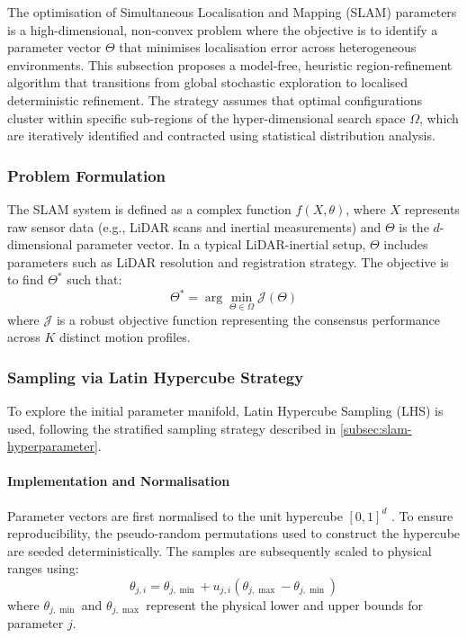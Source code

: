 The optimisation of Simultaneous Localisation and Mapping (SLAM) parameters is a high-dimensional, non-convex problem where the objective is to identify a parameter vector $\Theta$ that minimises localisation error across heterogeneous environments. This subsection proposes a model-free, heuristic region-refinement algorithm that transitions from global stochastic exploration to localised deterministic refinement. The strategy assumes that optimal configurations cluster within specific sub-regions of the hyper-dimensional search space $\Omega$, which are iteratively identified and contracted using statistical distribution analysis.

\subsubsection{Problem Formulation}
The SLAM system is defined as a complex function $f(X,\theta)$, where $X$ represents raw sensor data (e.g., LiDAR scans and inertial measurements) and $\Theta$ is the $d$-dimensional parameter vector. In a typical LiDAR-inertial setup, $\Theta$ includes parameters such as LiDAR resolution and registration strategy. The objective is to find $\Theta^*$ such that:
\begin{equation}
    \Theta^* = \arg\min_{\Theta \in \Omega} \mathcal{J}(\Theta)
\end{equation}
where $\mathcal{J}$ is a robust objective function representing the consensus performance across $K$ distinct motion profiles.

\subsubsection{Sampling via Latin Hypercube Strategy}
To explore the initial parameter manifold, Latin Hypercube Sampling (LHS) is used, following the stratified sampling strategy described in \cref{subsec:slam-hyperparameter}.

\paragraph{Implementation and Normalisation}
Parameter vectors are first normalised to the unit hypercube $[0, 1]^d$ \cite{deutschLatinHypercubeSampling2012}. To ensure reproducibility, the pseudo-random permutations used to construct the hypercube are seeded deterministically. The samples are subsequently scaled to physical ranges using:
\begin{equation}
    \theta_{j,i} = \theta_{j, \min} + u_{j,i} (\theta_{j, \max} - \theta_{j, \min})
\end{equation}
where $\theta_{j, \min}$ and $\theta_{j, \max}$ represent the physical lower and upper bounds for parameter $j$.

